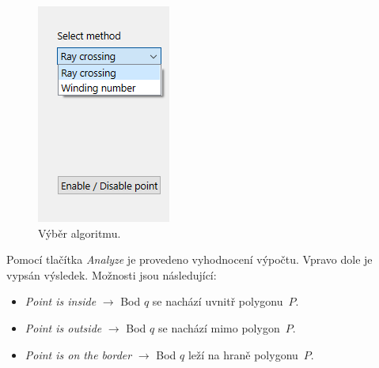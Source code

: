 \documentclass[a4paper, 12pt, oneside, titlepage]{article} %
\begin{document}
\begin{figure}[!htb]
	\centering
	\includegraphics[scale=0.8]{obrazky/select_met.png} 
	\caption{Výběr algoritmu.
	}
	\label{fig:select_met}
\end{figure} 
\FloatBarrier

Pomocí tlačítka \emph{Analyze} je provedeno vyhodnocení výpočtu. Vpravo dole je vypsán výsledek. Možnosti jsou následující:
\begin{itemize}
\item \emph{Point is inside} $\longrightarrow$ Bod $q$ se nachází uvnitř polygonu~$P$.
\item \emph{Point is outside} $\longrightarrow$ Bod $q$ se nachází mimo polygon~$P$.
\item \emph{Point is on the border} $\longrightarrow$ Bod $q$ leží na hraně polygonu~$P$.
\end{itemize}
\end{document}
